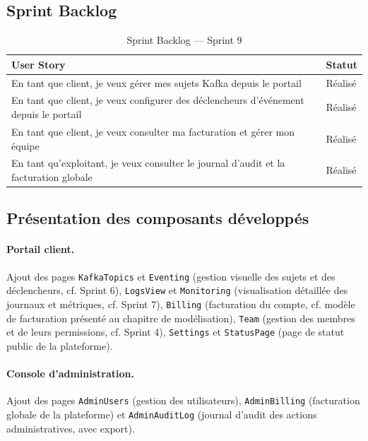 \subsection{Sprint Backlog}

\begin{table}[!ht]
\begin{center}
     \begin{tabular}{|l{11cm}|l{3cm}|}
     \hline
     \textbf{User Story} & \textbf{Statut} \\
     \hline
     En tant que client, je veux gérer mes sujets Kafka depuis le portail & Réalisé \\
     \hline
     En tant que client, je veux configurer des déclencheurs d'événement depuis le portail & Réalisé \\
     \hline
     En tant que client, je veux consulter ma facturation et gérer mon équipe & Réalisé \\
     \hline
     En tant qu'exploitant, je veux consulter le journal d'audit et la facturation globale & Réalisé \\
     \hline
     \end{tabular}
     \caption{Sprint Backlog — Sprint 9}
     \label{tab:sb-sprint9}
     \end{center}
\end{table}

\subsection{Présentation des composants développés}

\paragraph{Portail client.} Ajout des pages \texttt{KafkaTopics} et \texttt{Eventing} (gestion visuelle des sujets et des déclencheurs, cf. Sprint 6), \texttt{LogsView} et \texttt{Monitoring} (visualisation détaillée des journaux et métriques, cf. Sprint 7), \texttt{Billing} (facturation du compte, cf. modèle de facturation présenté au chapitre de modélisation), \texttt{Team} (gestion des membres et de leurs permissions, cf. Sprint 4), \texttt{Settings} et \texttt{StatusPage} (page de statut public de la plateforme).

\paragraph{Console d'administration.} Ajout des pages \texttt{AdminUsers} (gestion des utilisateurs), \texttt{AdminBilling} (facturation globale de la plateforme) et \texttt{AdminAuditLog} (journal d'audit des actions administratives, avec export).

